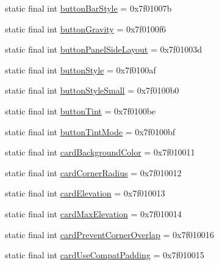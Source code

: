 \begin{CompactItemize}
\item 
static final int \hyperlink{classandroid_1_1support_1_1v7_1_1mediarouter_1_1_r_1_1attr_2c6c8224ee9da456654f94a89a1a549d}{buttonBarStyle} = 0x7f01007b
\item 
static final int \hyperlink{classandroid_1_1support_1_1v7_1_1mediarouter_1_1_r_1_1attr_6db10f92809b327eb517a3e08e1f13a4}{buttonGravity} = 0x7f0100f6
\item 
static final int \hyperlink{classandroid_1_1support_1_1v7_1_1mediarouter_1_1_r_1_1attr_0f9b4e5c32c2d22a9bfab61694360ecd}{buttonPanelSideLayout} = 0x7f01003d
\item 
static final int \hyperlink{classandroid_1_1support_1_1v7_1_1mediarouter_1_1_r_1_1attr_9ecfd025d4c7fa1ca861da301ae5d3bd}{buttonStyle} = 0x7f0100af
\item 
static final int \hyperlink{classandroid_1_1support_1_1v7_1_1mediarouter_1_1_r_1_1attr_1b5719ec65c21c2710a1a0b599a54578}{buttonStyleSmall} = 0x7f0100b0
\item 
static final int \hyperlink{classandroid_1_1support_1_1v7_1_1mediarouter_1_1_r_1_1attr_b496eccd10aa55381eb4a0dfd59beb0f}{buttonTint} = 0x7f0100be
\item 
static final int \hyperlink{classandroid_1_1support_1_1v7_1_1mediarouter_1_1_r_1_1attr_a3a8ed3c919175ccd7d4c04eb7c78ce1}{buttonTintMode} = 0x7f0100bf
\item 
static final int \hyperlink{classandroid_1_1support_1_1v7_1_1mediarouter_1_1_r_1_1attr_9287b4e04f2078ad7d5a1cac56e1ae71}{cardBackgroundColor} = 0x7f010011
\item 
static final int \hyperlink{classandroid_1_1support_1_1v7_1_1mediarouter_1_1_r_1_1attr_16d0b96c39262ed9ef16f73db7b3d92a}{cardCornerRadius} = 0x7f010012
\item 
static final int \hyperlink{classandroid_1_1support_1_1v7_1_1mediarouter_1_1_r_1_1attr_f04c4a7e443f1e79b88d9ef40120660a}{cardElevation} = 0x7f010013
\item 
static final int \hyperlink{classandroid_1_1support_1_1v7_1_1mediarouter_1_1_r_1_1attr_ac896d3d6509139d310c3ee60ddb3de4}{cardMaxElevation} = 0x7f010014
\item 
static final int \hyperlink{classandroid_1_1support_1_1v7_1_1mediarouter_1_1_r_1_1attr_5ee92a1e6d9f40994c1593a27fcbced5}{cardPreventCornerOverlap} = 0x7f010016
\item 
static final int \hyperlink{classandroid_1_1support_1_1v7_1_1mediarouter_1_1_r_1_1attr_946f4eb839af56d1c68cff71209d1e16}{cardUseCompatPadding} = 0x7f010015
\item 

\end{CompactItemize}
